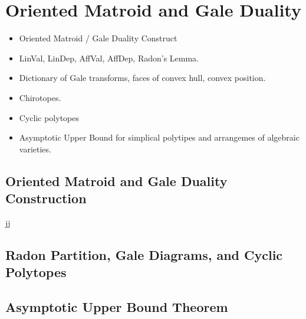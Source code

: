 \section{Oriented Matroid and Gale Duality}

\begin{itemize}
    \item Oriented Matroid / Gale Duality Construct
    \item LinVal, LinDep, AffVal, AffDep, Radon's Lemma.
    \item Dictionary of Gale transforms, faces of convex hull, convex position.
    \item Chirotopes.
    \item Cyclic polytopes
    \item Asymptotic Upper Bound for simplical polytipes and arrangemes of algebraic varieties.
\end{itemize}

\subsection{Oriented Matroid and Gale Duality Construction}

jj

\subsection{Radon Partition, Gale Diagrams, and Cyclic Polytopes}

\subsection{Asymptotic Upper Bound Theorem}
